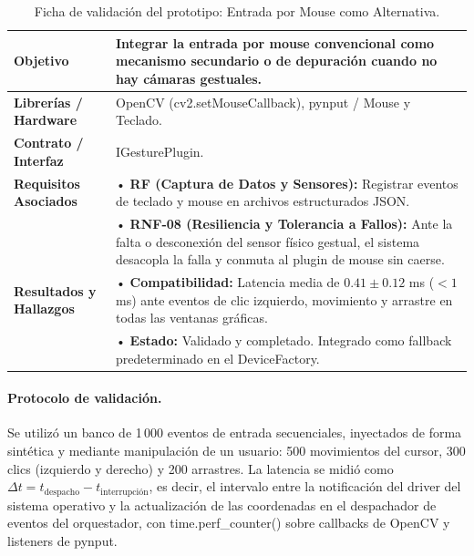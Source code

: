 \begin{table}[H]
    \centering
    \caption{Ficha de validación del prototipo: Entrada por Mouse como Alternativa.}
    \label{tab:ficha_f9}
    \begin{tabular}{|L{3.2cm}|L{11.0cm}|}
        \hline
        \textbf{Objetivo} & Integrar la entrada por mouse convencional como mecanismo secundario o de depuración cuando no hay cámaras gestuales. \\ \hline
        \textbf{Librerías / Hardware} & OpenCV (cv2.setMouseCallback), pynput / Mouse y Teclado. \\ \hline
        \textbf{Contrato / Interfaz} & IGesturePlugin. \\ \hline
        \textbf{Requisitos Asociados} &
        • \textbf{RF (Captura de Datos y Sensores):} Registrar eventos de teclado y mouse en archivos estructurados JSON. \vspace{0.1cm} \\
        & • \textbf{RNF-08 (Resiliencia y Tolerancia a Fallos):} Ante la falta o desconexión del sensor físico gestual, el sistema desacopla la falla y conmuta al plugin de mouse sin caerse. \\ \hline
        \textbf{Resultados y Hallazgos} &
        • \textbf{Compatibilidad:} Latencia media de $0.41 \pm 0.12$ ms ($<1$ ms) ante eventos de clic izquierdo, movimiento y arrastre en todas las ventanas gráficas. \vspace{0.1cm} \\
        & • \textbf{Estado:} Validado y completado. Integrado como fallback predeterminado en el DeviceFactory. \\ \hline
    \end{tabular}
\end{table}
 
\paragraph{Protocolo de validación.} Se utilizó un banco de 1\,000 eventos de entrada secuenciales, inyectados de forma sintética y mediante manipulación de un usuario: 500 movimientos del cursor, 300 clics (izquierdo y derecho) y 200 arrastres. La latencia se midió como $\Delta t = t_{\mathrm{despacho}} - t_{\mathrm{interrupción}}$, es decir, el intervalo entre la notificación del driver del sistema operativo y la actualización de las coordenadas en el despachador de eventos del orquestador, con time.perf\_counter() sobre callbacks de OpenCV y listeners de pynput.
 
